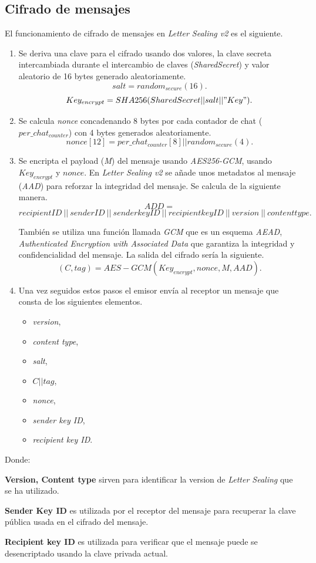 \subsection{Cifrado de mensajes}
El funcionamiento de cifrado de mensajes en \emph{Letter Sealing v2} es el siguiente.
\begin{enumerate}
	\item Se deriva una clave para el cifrado usando dos valores, la clave secreta intercambiada durante el intercambio de claves (\emph{SharedSecret}) y valor aleatorio de 16 bytes generado aleatoriamente.
		$$
			salt = random_{secure}(16).
		$$
		$$
			Key_{encrypt}=SHA256(SharedSecret||salt||"Key").
		$$
	\item Se calcula \emph{nonce} concadenando 8 bytes por cada contador de chat ($per\_chat_{counter}$) con 4 bytes generados aleatoriamente.
		$$
			nonce[12]=per\_chat_{counter}[8] || random_{secure}(4).
		$$
	\item Se encripta el payload (\emph{M}) del mensaje usando \emph{AES256-GCM}, usando $Key_{encrypt}$ y $nonce$. En \emph{Letter Sealing v2} se añade unos metadatos al mensaje (\emph{AAD}) para reforzar la integridad del mensaje. Se calcula de la siguiente manera.
		$$
			ADD =
		$$
		$$
			 recipientID\:||\: senderID\:||\:senderkeyID\:||\:recipientkeyID\:||\:version\:||\:contenttype.
		$$

		También se utiliza una función llamada \emph{GCM} que es un esquema \emph{AEAD}, \emph{Authenticated Encryption with Associated Data} que garantiza la integridad y confidencialidad del mensaje. La salida del cifrado sería la siguiente.
		$$
			(C,tag) = AES - GCM(Key_{encrypt}, nonce, M, AAD).
		$$
	\item Una vez seguidos estos pasos el emisor envía al receptor un mensaje que consta de los siguientes elementos.
	\begin{itemize}
		\item \emph{version},
		\item \emph{content type},
		\item \emph{salt},
		\item $C||tag$,
		\item \emph{nonce},
		\item \emph{sender key ID},
		\item \emph{recipient key ID}.
	\end{itemize}
\end{enumerate}
Donde:
\begin{description}
	\item \textbf{Version, Content type} sirven para identificar la version de \emph{Letter Sealing} que se ha utilizado.
	\item \textbf{Sender Key ID} es utilizada por el receptor del mensaje para recuperar la clave pública usada en el cifrado del mensaje.
	\item \textbf{Recipient key ID} es utilizada para verificar que el mensaje puede se desencriptado usando la clave privada actual.
\end{description}

